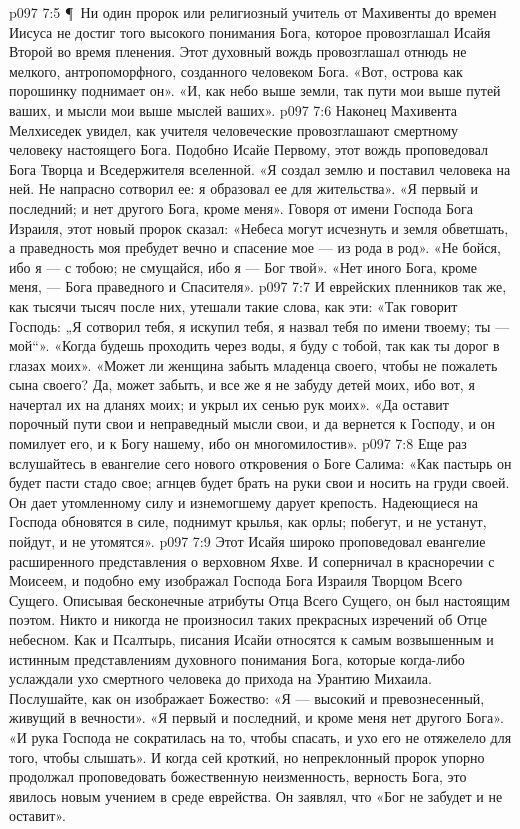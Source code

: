 \vs p097 7:5 \P\ Ни один пророк или религиозный учитель от Махивенты до времен Иисуса не достиг того высокого понимания Бога, которое провозглашал Исайя Второй во время пленения. Этот духовный вождь провозглашал отнюдь не мелкого, антропоморфного, созданного человеком Бога. «Вот, острова как порошинку поднимает он». «И, как небо выше земли, так пути мои выше путей ваших, и мысли мои выше мыслей ваших».
\vs p097 7:6 Наконец Махивента Мелхиседек увидел, как учителя человеческие провозглашают смертному человеку настоящего Бога. Подобно Исайе Первому, этот вождь проповедовал Бога Творца и Вседержителя вселенной. «Я создал землю и поставил человека на ней. Не напрасно сотворил ее: я образовал ее для жительства». «Я первый и последний; и нет другого Бога, кроме меня». Говоря от имени Господа Бога Израиля, этот новый пророк сказал: «Небеса могут исчезнуть и земля обветшать, а праведность моя пребудет вечно и спасение мое --- из рода в род». «Не бойся, ибо я --- с тобою; не смущайся, ибо я --- Бог твой». «Нет иного Бога, кроме меня, --- Бога праведного и Спасителя».
\vs p097 7:7 И еврейских пленников так же, как тысячи тысяч после них, утешали такие слова, как эти: «Так говорит Господь: „Я сотворил тебя, я искупил тебя, я назвал тебя по имени твоему; ты --- мой“». «Когда будешь проходить через воды, я буду с тобой, так как ты дорог в глазах моих». «Может ли женщина забыть младенца своего, чтобы не пожалеть сына своего? Да, может забыть, и все же я не забуду детей моих, ибо вот, я начертал их на дланях моих; и укрыл их сенью рук моих». «Да оставит порочный пути свои и неправедный мысли свои, и да вернется к Господу, и он помилует его, и к Богу нашему, ибо он многомилостив».
\vs p097 7:8 Еще раз вслушайтесь в евангелие сего нового откровения о Боге Салима: «Как пастырь он будет пасти стадо свое; агнцев будет брать на руки свои и носить на груди своей. Он дает утомленному силу и изнемогшему дарует крепость. Надеющиеся на Господа обновятся в силе, поднимут крылья, как орлы; побегут, и не устанут, пойдут, и не утомятся».
\vs p097 7:9 Этот Исайя широко проповедовал евангелие расширенного представления о верховном Яхве. И соперничал в красноречии с Моисеем, и подобно ему изображал Господа Бога Израиля Творцом Всего Сущего. Описывая бесконечные атрибуты Отца Всего Сущего, он был настоящим поэтом. Никто и никогда не произносил таких прекрасных изречений об Отце небесном. Как и Псалтырь, писания Исайи относятся к самым возвышенным и истинным представлениям духовного понимания Бога, которые когда\hyp{}либо услаждали ухо смертного человека до прихода на Урантию Михаила. Послушайте, как он изображает Божество: «Я --- высокий и превознесенный, живущий в вечности». «Я первый и последний, и кроме меня нет другого Бога». «И рука Господа не сократилась на то, чтобы спасать, и ухо его не отяжелело для того, чтобы слышать». И когда сей кроткий, но непреклонный пророк упорно продолжал проповедовать божественную неизменность, верность Бога, это явилось новым учением в среде еврейства. Он заявлял, что «Бог не забудет и не оставит».
